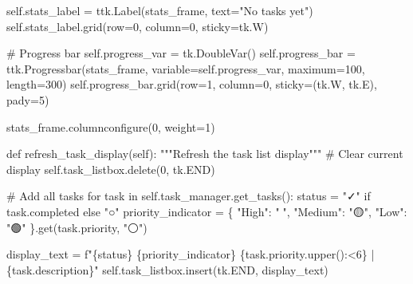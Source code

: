 \documentclass[
  letterpaper,
  DIV=11,
  numbers=noendperiod,
  oneside]{scrreprt}
\newenvironment{Shaded}{}{}
\newcommand{\CommentTok}[1]{\textcolor[rgb]{0.42,0.45,0.49}{#1}}
\newcommand{\ControlFlowTok}[1]{\textcolor[rgb]{0.84,0.23,0.29}{#1}}
\newcommand{\DecValTok}[1]{\textcolor[rgb]{0.00,0.36,0.77}{#1}}
\newcommand{\KeywordTok}[1]{\textcolor[rgb]{0.84,0.23,0.29}{#1}}
\newcommand{\NormalTok}[1]{\textcolor[rgb]{0.14,0.16,0.18}{#1}}
\newcommand{\OperatorTok}[1]{\textcolor[rgb]{0.14,0.16,0.18}{#1}}
\newcommand{\SpecialCharTok}[1]{\textcolor[rgb]{0.00,0.36,0.77}{#1}}
\newcommand{\SpecialStringTok}[1]{\textcolor[rgb]{0.01,0.18,0.38}{#1}}
\newcommand{\StringTok}[1]{\textcolor[rgb]{0.01,0.18,0.38}{#1}}
\newcommand{\VariableTok}[1]{\textcolor[rgb]{0.89,0.38,0.04}{#1}}
\begin{document}
\begin{Shaded}
\begin{Highlighting}[]
        \VariableTok{self}\NormalTok{.stats\_label }\OperatorTok{=}\NormalTok{ ttk.Label(stats\_frame, text}\OperatorTok{=}\StringTok{"No tasks yet"}\NormalTok{)}
        \VariableTok{self}\NormalTok{.stats\_label.grid(row}\OperatorTok{=}\DecValTok{0}\NormalTok{, column}\OperatorTok{=}\DecValTok{0}\NormalTok{, sticky}\OperatorTok{=}\NormalTok{tk.W)}
        
        \CommentTok{\# Progress bar}
        \VariableTok{self}\NormalTok{.progress\_var }\OperatorTok{=}\NormalTok{ tk.DoubleVar()}
        \VariableTok{self}\NormalTok{.progress\_bar }\OperatorTok{=}\NormalTok{ ttk.Progressbar(stats\_frame, variable}\OperatorTok{=}\VariableTok{self}\NormalTok{.progress\_var, }
\NormalTok{                                          maximum}\OperatorTok{=}\DecValTok{100}\NormalTok{, length}\OperatorTok{=}\DecValTok{300}\NormalTok{)}
        \VariableTok{self}\NormalTok{.progress\_bar.grid(row}\OperatorTok{=}\DecValTok{1}\NormalTok{, column}\OperatorTok{=}\DecValTok{0}\NormalTok{, sticky}\OperatorTok{=}\NormalTok{(tk.W, tk.E), pady}\OperatorTok{=}\DecValTok{5}\NormalTok{)}
        
\NormalTok{        stats\_frame.columnconfigure(}\DecValTok{0}\NormalTok{, weight}\OperatorTok{=}\DecValTok{1}\NormalTok{)}
    
    \KeywordTok{def}\NormalTok{ refresh\_task\_display(}\VariableTok{self}\NormalTok{):}
        \CommentTok{"""Refresh the task list display"""}
        \CommentTok{\# Clear current display}
        \VariableTok{self}\NormalTok{.task\_listbox.delete(}\DecValTok{0}\NormalTok{, tk.END)}
        
        \CommentTok{\# Add all tasks}
        \ControlFlowTok{for}\NormalTok{ task }\KeywordTok{in} \VariableTok{self}\NormalTok{.task\_manager.get\_tasks():}
\NormalTok{            status }\OperatorTok{=} \StringTok{"✓"} \ControlFlowTok{if}\NormalTok{ task.completed }\ControlFlowTok{else} \StringTok{"○"}
\NormalTok{            priority\_indicator }\OperatorTok{=}\NormalTok{ \{}
                \StringTok{"High"}\NormalTok{: }\StringTok{"🔴"}\NormalTok{,}
                \StringTok{"Medium"}\NormalTok{: }\StringTok{"🟡"}\NormalTok{, }
                \StringTok{"Low"}\NormalTok{: }\StringTok{"🟢"}
\NormalTok{            \}.get(task.priority, }\StringTok{"⚪"}\NormalTok{)}
            
\NormalTok{            display\_text }\OperatorTok{=} \SpecialStringTok{f"}\SpecialCharTok{\{}\NormalTok{status}\SpecialCharTok{\}}\SpecialStringTok{ }\SpecialCharTok{\{}\NormalTok{priority\_indicator}\SpecialCharTok{\}}\SpecialStringTok{ }\SpecialCharTok{\{}\NormalTok{task}\SpecialCharTok{.}\NormalTok{priority}\SpecialCharTok{.}\NormalTok{upper()}\SpecialCharTok{:\textless{}6\}}\SpecialStringTok{ | }\SpecialCharTok{\{}\NormalTok{task}\SpecialCharTok{.}\NormalTok{description}\SpecialCharTok{\}}\SpecialStringTok{"}
            \VariableTok{self}\NormalTok{.task\_listbox.insert(tk.END, display\_text)}
        

\end{Highlighting}
\end{Shaded}
\end{document}
